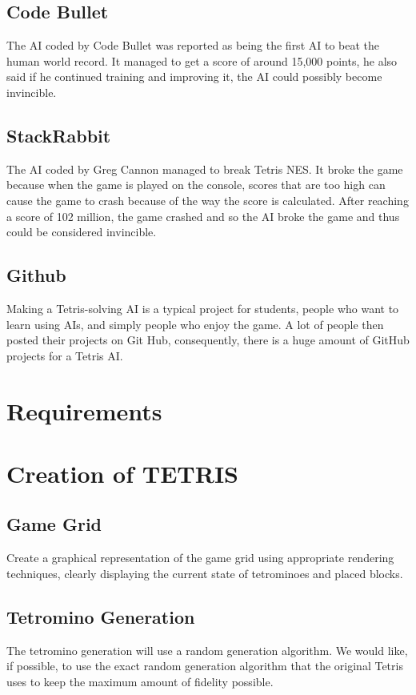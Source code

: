 \documentclass[conference]{IEEEtran}
\begin{document}
\subsection{Code Bullet}
The AI coded by Code Bullet\cite{b1} was reported as being the first AI to beat the human world record. It managed to get a score of around 15,000 points, he also said if he continued training and improving it, the AI could possibly become invincible.
\subsection{StackRabbit}
The AI coded by Greg Cannon\cite{b2} managed to break Tetris NES. It broke the game because when the game is played on the console, scores that are too high can cause the game to crash because of the way the score is calculated. After reaching a score of 102 million, the game crashed and so the AI broke the game and thus could be considered invincible.
\subsection{Github}
Making a Tetris-solving AI is a typical project for students, people who want to learn using AIs, and simply people who enjoy the game. A lot of people then posted their projects on Git Hub\cite{b3}, consequently, there is a huge amount of GitHub projects for a Tetris AI.

\section{Requirements}
\section*{Creation of TETRIS}
\subsection{Game Grid}
Create a graphical representation of the game grid using appropriate rendering techniques, clearly displaying the current state of tetrominoes and placed blocks.
\subsection{Tetromino Generation}
The tetromino generation will use a random generation algorithm. We would like, if possible, to use the exact random generation algorithm that the original Tetris uses to keep the maximum amount of fidelity possible.
\end{document}
